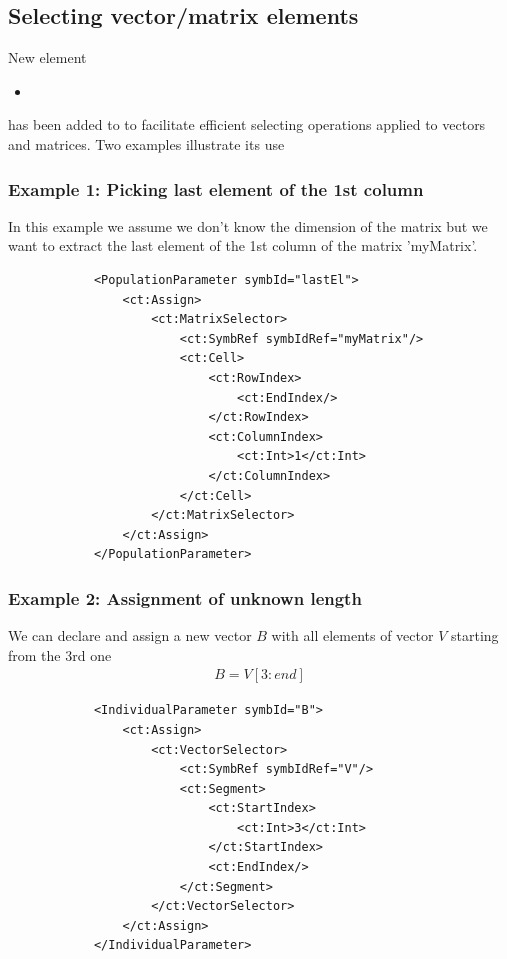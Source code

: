 \subsection{Selecting vector/matrix elements}
\label{sec:EndIndex}

New element 
\begin{itemize}
\item 
{} 
\end{itemize}
has been added to 
to facilitate efficient selecting operations applied to vectors and matrices.
Two examples illustrate its use

\subsubsection*{Example 1: Picking last element of the 1st column}
In this example we assume we don't know the dimension of the matrix but
we want to extract the last element of the 1st column of the matrix 'myMatrix'.

\lstset{language=XML}
\begin{lstlisting}
            <PopulationParameter symbId="lastEl">
                <ct:Assign>
                    <ct:MatrixSelector>
                        <ct:SymbRef symbIdRef="myMatrix"/>
                        <ct:Cell>
                            <ct:RowIndex>
                                <ct:EndIndex/>
                            </ct:RowIndex>
                            <ct:ColumnIndex>
                                <ct:Int>1</ct:Int>
                            </ct:ColumnIndex>
                        </ct:Cell>
                    </ct:MatrixSelector>
                </ct:Assign>
            </PopulationParameter>
\end{lstlisting}

\subsubsection*{Example 2: Assignment of unknown length}
We can declare and assign a new vector $B$ with all elements of vector
$V$ starting from the 3rd one 
\begin{align}
B = V[3:end] \nonumber 
\end{align}

\lstset{language=XML}
\begin{lstlisting}
            <IndividualParameter symbId="B">
                <ct:Assign>
                    <ct:VectorSelector>
                        <ct:SymbRef symbIdRef="V"/>
                        <ct:Segment>
                            <ct:StartIndex>
                                <ct:Int>3</ct:Int>
                            </ct:StartIndex>
                            <ct:EndIndex/>
                        </ct:Segment>
                    </ct:VectorSelector>
                </ct:Assign>
            </IndividualParameter>
\end{lstlisting}

